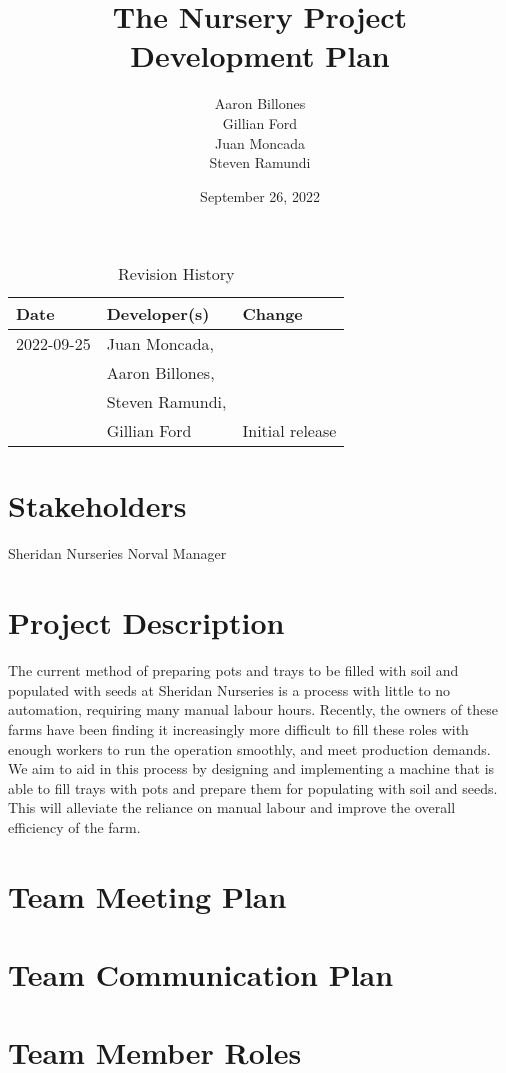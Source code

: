 \documentclass{article}
\title{The Nursery Project\\ Development Plan}
\author{Aaron Billones\\Gillian Ford\\Juan Moncada\\Steven Ramundi}
\date{September 26, 2022}
\begin{document}
\begin{table}[hp]
	\caption{Revision History} \label{TblRevisionHistory}
	\begin{tabularx}{\textwidth}{llX}
	\toprule
	\textbf{Date} & \textbf{Developer(s)} & \textbf{Change}\\
	\midrule
	2022-09-25 & Juan Moncada,\\&Aaron Billones,\\&Steven Ramundi,\\&Gillian Ford & Initial release\\
	\bottomrule
	\end{tabularx}
	\end{table}
	
	\newpage
	
	\maketitle
	\section{Stakeholders}
	Sheridan Nurseries Norval Manager
	
	\section{Project Description} 
	The current method of preparing pots and trays to be filled with soil and populated with seeds at Sheridan Nurseries is a process with little to no automation, requiring many manual labour hours. Recently, the owners of these farms have been finding it increasingly more difficult to fill these roles with enough workers to run the operation smoothly, and meet production demands. We aim to aid in this process by designing and implementing a machine that is able to fill trays with pots and prepare them for populating with soil and seeds. This will alleviate the reliance on manual labour and improve the overall efficiency of the farm.
	
	
	\section{Team Meeting Plan}
	
	\section{Team Communication Plan}
	
	\section{Team Member Roles}
	
\end{document}

